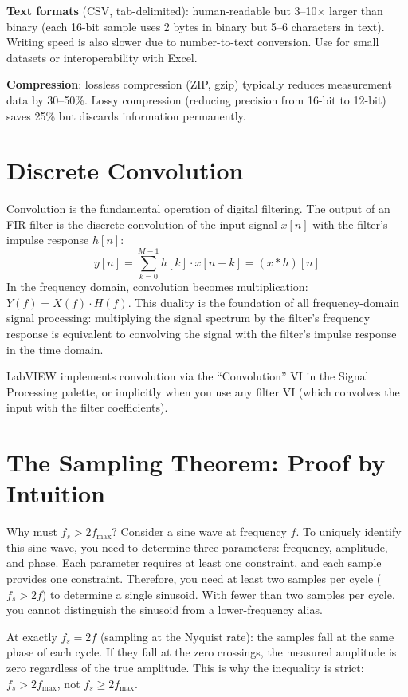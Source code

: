 \documentclass[11pt,letterpaper,twoside,openany]{book}
\begin{document}
\textbf{Text formats} (CSV, tab-delimited): human-readable but 3--10$\times$ larger than binary (each 16-bit sample uses 2 bytes in binary but 5--6 characters in text). Writing speed is also slower due to number-to-text conversion. Use for small datasets or interoperability with Excel.

\textbf{Compression}: lossless compression (ZIP, gzip) typically reduces measurement data by 30--50\%. Lossy compression (reducing precision from 16-bit to 12-bit) saves 25\% but discards information permanently.

\section{Discrete Convolution}
Convolution is the fundamental operation of digital filtering. The output of an FIR filter is the discrete convolution of the input signal $x[n]$ with the filter's impulse response $h[n]$:
\begin{equation}
y[n] = \sum_{k=0}^{M-1} h[k] \cdot x[n-k] = (x * h)[n]
\end{equation}
In the frequency domain, convolution becomes multiplication: $Y(f) = X(f) \cdot H(f)$. This duality is the foundation of all frequency-domain signal processing: multiplying the signal spectrum by the filter's frequency response is equivalent to convolving the signal with the filter's impulse response in the time domain.

LabVIEW implements convolution via the ``Convolution'' VI in the Signal Processing palette, or implicitly when you use any filter VI (which convolves the input with the filter coefficients).

\section{The Sampling Theorem: Proof by Intuition}
Why must $f_s > 2f_{\max}$? Consider a sine wave at frequency $f$. To uniquely identify this sine wave, you need to determine three parameters: frequency, amplitude, and phase. Each parameter requires at least one constraint, and each sample provides one constraint. Therefore, you need at least two samples per cycle ($f_s > 2f$) to determine a single sinusoid. With fewer than two samples per cycle, you cannot distinguish the sinusoid from a lower-frequency alias.

At exactly $f_s = 2f$ (sampling at the Nyquist rate): the samples fall at the same phase of each cycle. If they fall at the zero crossings, the measured amplitude is zero regardless of the true amplitude. This is why the inequality is strict: $f_s > 2f_{\max}$, not $f_s \geq 2f_{\max}$.
\end{document}
